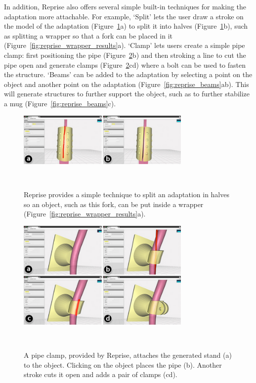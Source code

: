 In addition, Reprise also offers several simple built-in techniques for making the adaptation more attachable. For example, `Split' lets the user draw a stroke on the model of the adaptation (Figure~\ref{fig:reprise_split}a) to split it into halves (Figure~\ref{fig:reprise_split}b), such as splitting a wrapper so that a fork can be placed in it (Figure~\ref{fig:reprise_wrapper_results}a). `Clamp' lets users create a simple pipe clamp: first positioning the pipe (Figure~\ref{fig:reprise_pipeclamp}b) and then stroking a line to cut the pipe open and generate clamps (Figure~\ref{fig:reprise_pipeclamp}cd) where a bolt can be used to fasten the structure. `Beams' can be added to the adaptation by selecting a point on the object and another point on the adaptation (Figure~\ref{fig:reprise_beams}ab). This will generate structures to further support the object, such as to further stabilize a mug (Figure~\ref{fig:reprise_beams}c).
\vskip 3pt


\begin{figure}[h!]
  \vskip 10pt
  \centering
  \includegraphics[width=0.75\textwidth]{figures/reprise_split_v1.pdf}
  \caption{Reprise provides a simple technique to split an adaptation in halves so an object, such as this fork, can be put inside a wrapper (Figure~\ref{fig:reprise_wrapper_results}a).}~\label{fig:reprise_split}
\end{figure}

\begin{figure}[h!]
  \vskip 8pt
  \centering
  \includegraphics[width=0.75\textwidth]{figures/reprise_pipeclamp_v1.pdf}
  \caption{A pipe clamp, provided by Reprise, attaches the generated stand (a) to the object. Clicking on the object places the pipe (b). Another stroke cuts it open and adds a pair of clamps (cd).}~\label{fig:reprise_pipeclamp}
\end{figure}

